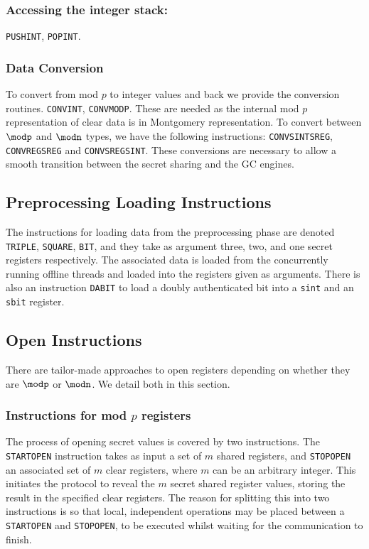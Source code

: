 \subsubsection{Accessing the integer stack:}
\verb+PUSHINT+, \verb+POPINT+.

\subsubsection{Data Conversion}
To convert from mod $p$ to integer values and
back we provide the conversion routines.
\verb+CONVINT+, \verb+CONVMODP+.
These are needed as the internal mod $p$ representation
of clear data is in Montgomery representation.
To convert between $\modp$ and $\modn$ types, we have the following instructions: \verb+CONVSINTSREG+, \verb+CONVREGSREG+ and \verb+CONVSREGSINT+. These conversions are necessary to allow a smooth transition between the secret sharing and the GC engines.

\subsection{Preprocessing Loading Instructions}
The instructions for loading data from the preprocessing phase
are denoted \verb+TRIPLE+, \verb+SQUARE+, \verb+BIT+,
and they take as argument three, two, and one secret registers 
respectively.
The associated data is loaded from the concurrently running
offline threads and loaded into the registers given as arguments.
There is also an instruction \verb+DABIT+ to load a doubly authenticated
bit into a \verb|sint| and an \verb|sbit| register.

\subsection{Open Instructions}
There are tailor-made approaches to open registers depending on whether they are $\modp$ or $\modn$. We detail both in this section. 

\subsubsection{Instructions for mod $p$ registers}
The process of opening secret values is covered by two instructions.
The \verb+STARTOPEN+ instruction takes as input a set of $m$
shared registers, and \verb+STOPOPEN+ an associated set of $m$
clear registers, where $m$ can be an arbitrary integer.
This initiates the protocol to reveal the $m$ secret shared register values,
storing the result in the specified clear registers. The reason for
splitting this into two instructions is so that local, independent
operations may be placed between a \verb+STARTOPEN+ and \verb+STOPOPEN+,
to be executed whilst waiting for the communication to finish.

